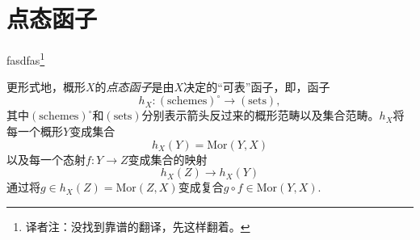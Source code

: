 \section{点态函子}
fasdfas\footnote{译者注：没找到靠谱的翻译，先这样翻着。}

更形式地，概形$X$的\textit{点态函子}是由$X$决定的“可表”函子，即，函子
\[
	h_X:(\text{schemes})^\circ\to (\text{sets}),
\]
其中$(\text{schemes})^\circ$和$(\text{sets})$分别表示箭头反过来的概形范畴以及集合范畴。$h_X$将每一个概形$Y$变成集合
\[
	h_X(Y)=\mathrm{Mor}(Y,X)
\]
以及每一个态射$f:Y\to Z$变成集合的映射
\[
	h_X(Z)\to h_X(Y)
\]
通过将$g\in h_X(Z)=\mathrm{Mor}(Z,X)$变成复合$g\circ f\in \mathrm{Mor}(Y,X)$.